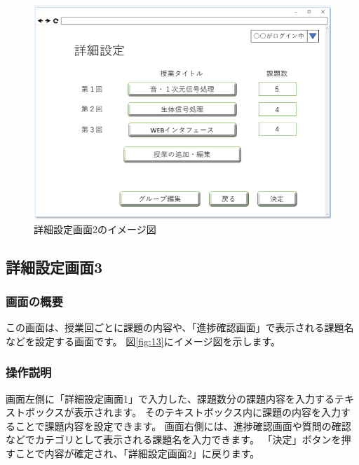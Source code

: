 \begin{figure}[htbp]
  \begin{center}
    \includegraphics[width=1\linewidth,clip]{./img/12.png}
    \caption{詳細設定画面2のイメージ図}\label{fig:12}
  \end{center}
\end{figure}

\newpage

\subsection{詳細設定画面3}
\subsubsection{画面の概要}
この画面は、授業回ごとに課題の内容や、「進捗確認画面」で表示される課題名などを設定する画面です。
図\ref{fig:13}にイメージ図を示します。

\subsubsection{操作説明}
画面左側に「詳細設定画面1」で入力した、課題数分の課題内容を入力するテキストボックスが表示されます。
そのテキストボックス内に課題の内容を入力することで課題内容を設定できます。
画面右側には、進捗確認画面や質問の確認などでカテゴリとして表示される課題名を入力できます。
「決定」ボタンを押すことで内容が確定され、「詳細設定画面2」に戻ります。

